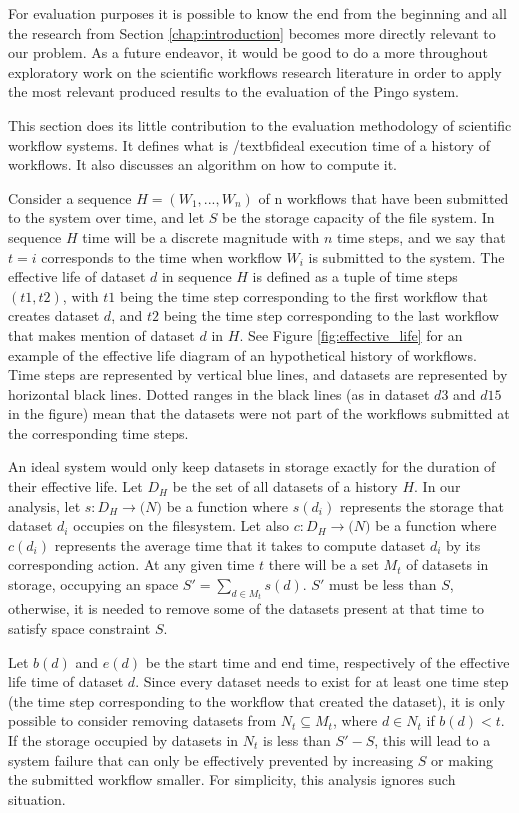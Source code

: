 For evaluation purposes it is possible to know the end from the beginning and all the research from Section \ref{chap:introduction} becomes more directly relevant to our problem.  As a future endeavor, it would be good to do a more throughout exploratory work on the scientific workflows research literature in order to apply the most relevant produced results to the evaluation of the Pingo system.

This section does its little contribution to the evaluation methodology of scientific workflow systems.  It defines what is /textbf{ideal execution time of a history of workflows}.  It also discusses an algorithm on how to compute it.  

Consider a sequence $H=(W_1, ..., W_n)$ of n workflows that have been submitted to the system over time, and let $S$ be the storage capacity of the file system.  In sequence $H$ time will be a discrete magnitude with $n$ time steps, and we say that $t = i$ corresponds to the time when workflow $W_i$ is submitted to the system. The effective life of dataset $d$ in sequence $H$ is defined as a tuple of time steps $(t1, t2)$, with $t1$ being the time step corresponding to the first workflow that creates dataset $d$, and  $t2$ being the time step corresponding to the last workflow that makes mention of dataset $d$ in $H$.  See Figure \ref{fig:effective_life} for an example of the effective life diagram of an hypothetical history of workflows.  Time steps are represented by vertical blue lines, and datasets are represented by horizontal black lines.  Dotted ranges in the black lines (as in dataset $d3$ and $d15$ in the figure) mean that the datasets were not part of the workflows submitted at the corresponding time steps.

An ideal system would only keep datasets in storage exactly for the duration of their effective life.  Let $D_H$ be the set of all datasets of a history $H$.  In our analysis, let $s: D_H \to \mathtt(N)$ be a function where $s(d_i)$ represents the storage that dataset $d_i$ occupies on the filesystem.  Let also $c: D_H \to \mathtt(N)$ be a function where $c(d_i)$ represents the average time that it takes to compute dataset $d_i$ by its corresponding action. At any given time $t$ there will be a set $M_t$ of datasets in storage, occupying an space $S' = \sum_{d \in M_t}{s(d)}$.  $S'$ must be less than $S$, otherwise, it is needed to remove some of the datasets present at that time to satisfy space constraint $S$.

Let $b(d)$ and $e(d)$ be the start time and end time, respectively of the effective life time of dataset $d$.  Since every dataset needs to exist for at least one time step (the time step corresponding to the workflow that created the dataset), it is only possible to consider removing datasets from $N_t \subseteq M_t$, where $d \in N_t$ if $b(d) < t$.  If the storage occupied by datasets in $N_t$ is less than $S' - S$, this will lead to a system failure that can only be effectively prevented by increasing $S$ or making the submitted workflow smaller.  For simplicity, this analysis ignores such situation.

